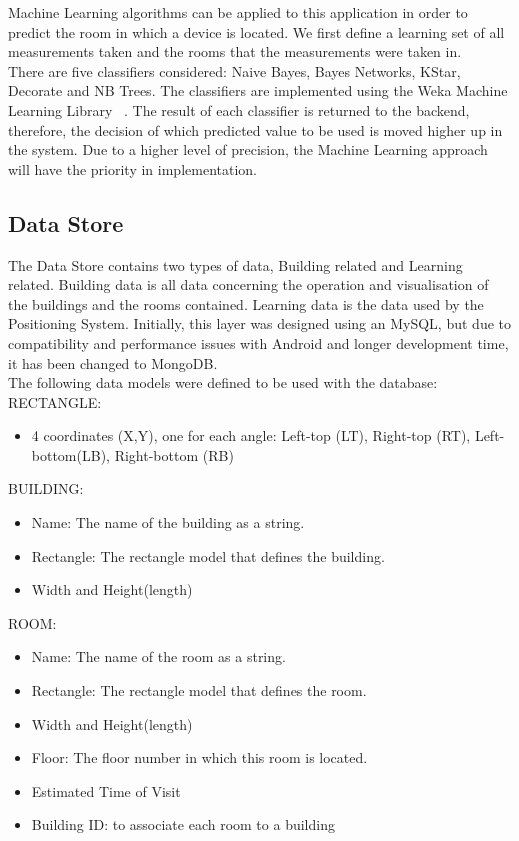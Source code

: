 Machine Learning algorithms can be applied to this application in order to predict the room in which a device is located. We first define a learning set of all measurements taken and the rooms that the measurements were taken in.\\
There are five classifiers considered:
Naive Bayes, Bayes Networks, KStar, Decorate and NB Trees. The classifiers are implemented using the Weka Machine Learning Library ~\cite{Weka}. The result of each classifier is returned to the backend, therefore, the decision of which predicted value to be used is moved higher up in the system.
Due to a higher level of precision, the Machine Learning approach will have the priority in implementation.

\subsection{Data Store}
The Data Store contains two types of data, Building related and Learning related. 
Building data is all data concerning the operation and visualisation of the buildings and the rooms contained. Learning data is the data used by the Positioning System.
Initially, this layer was designed using an MySQL, but due to compatibility and performance issues with Android and longer development time, it has been changed to MongoDB.
\\
The following data models were defined to be used with the database:
\\
RECTANGLE:	
\begin{itemize}
	\item 4 coordinates (X,Y), one for each angle: Left-top (LT), Right-top (RT), Left-bottom(LB), Right-bottom (RB)
\end{itemize}

BUILDING:
\begin{itemize}
	\item Name: The name of the building as a string.
	\item Rectangle: The rectangle model that defines the building.
	\item Width and Height(length)
\end{itemize}


ROOM: 
\begin{itemize}
	\item Name: The name of the room as a string.
	\item Rectangle: The rectangle model that defines the room.
	\item Width and Height(length)
	\item Floor: The floor number in which this room is located.
	\item Estimated Time of Visit
	\item Building ID: to associate each room to a building
\end{itemize}

